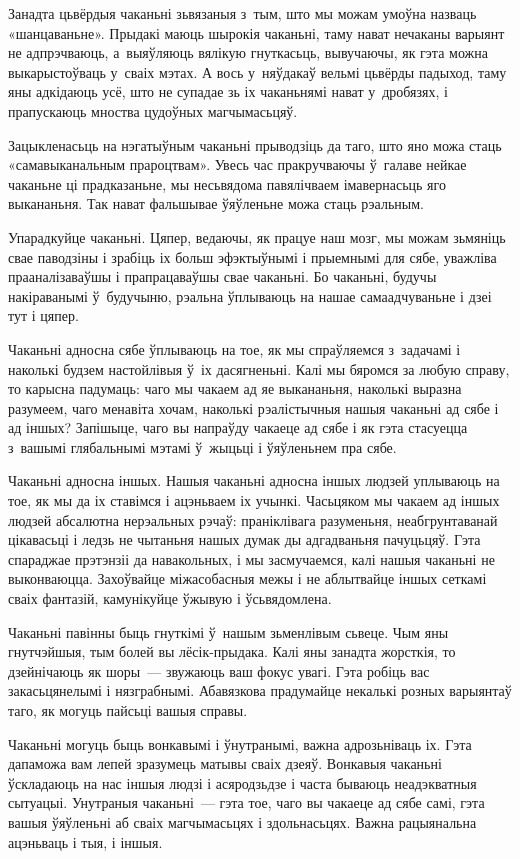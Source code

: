 Занадта цьвёрдыя чаканьні зьвязаныя з~тым, што мы можам умоўна назваць «шанцаваньне». Прыдакі маюць шырокія чаканьні, таму нават нечаканы варыянт не адпрэчваюць, а~выяўляюць вялікую гнуткасьць, вывучаючы, як гэта можна выкарыстоўваць у~сваіх мэтах. А вось у~няўдакаў вельмі цьвёрды падыход, таму яны адкідаюць усё, што не супадае зь іх чаканьнямі нават у~дробязях, і прапускаюць мноства цудоўных магчымасьцяў.

Зацыкленасьць на нэгатыўным чаканьні прыводзіць да таго, што яно можа стаць «самавыканальным прароцтвам». Увесь час пракручваючы ў~галаве нейкае чаканьне ці прадказаньне, мы несьвядома павялічваем імавернасьць яго выкананьня. Так нават фальшывае ўяўленьне можа стаць рэальным.

Упарадкуйце чаканьні. Цяпер, ведаючы, як працуе наш мозг, мы можам зьмяніць свае паводзіны і зрабіць іх больш эфэктыўнымі і прыемнымі для сябе, уважліва прааналізаваўшы і прапрацаваўшы свае чаканьні. Бо чаканьні, будучы накіраванымі ў~будучыню, рэальна ўплываюць на нашае самаадчуваньне і дзеі тут і цяпер.

Чаканьні адносна сябе ўплываюць на тое, як мы спраўляемся з~задачамі і наколькі будзем настойлівыя ў~іх дасягненьні. Калі мы бяромся за любую справу, то карысна падумаць: чаго мы чакаем ад яе выкананьня, наколькі выразна разумеем, чаго менавіта хочам, наколькі рэалістычныя нашыя чаканьні ад сябе і ад іншых? Запішыце, чаго вы напраўду чакаеце ад сябе і як гэта стасуецца з~вашымі глябальнымі мэтамі ў~жыцьці і ўяўленьнем пра сябе.

Чаканьні адносна іншых. Нашыя чаканьні адносна іншых людзей уплываюць на тое, як мы да іх ставімся і ацэньваем іх учынкі. Часьцяком мы чакаем ад іншых людзей абсалютна нерэальных рэчаў: праніклівага разуменьня, неабгрунтаванай цікавасьці і ледзь не чытаньня нашых думак ды адгадваньня пачуцьцяў. Гэта спараджае прэтэнзіі да навакольных, і мы засмучаемся, калі нашыя чаканьні не выконваюцца. Захоўвайце міжасобасныя межы і не аблытвайце іншых сеткамі сваіх фантазій, камунікуйце ўжывую і ўсьвядомлена.

Чаканьні павінны быць гнуткімі ў~нашым зьменлівым сьвеце. Чым яны гнутчэйшыя, тым болей вы лёсік-прыдака. Калі яны занадта жорсткія, то дзейнічаюць як шоры~--- звужаюць ваш фокус увагі. Гэта робіць вас закасьцянелымі і нязграбнымі. Абавязкова прадумайце некалькі розных варыянтаў таго, як могуць пайсьці вашыя справы.

Чаканьні могуць быць вонкавымі і ўнутранымі, важна адрозьніваць іх. Гэта дапаможа вам лепей зразумець матывы сваіх дзеяў. Вонкавыя чаканьні ўскладаюць на нас іншыя людзі і асяродзьдзе і часта бываюць неадэкватныя сытуацыі. Унутраныя чаканьні~--- гэта тое, чаго вы чакаеце ад сябе самі, гэта вашыя ўяўленьні аб сваіх магчымасьцях і здольнасьцях. Важна рацыянальна ацэньваць і тыя, і іншыя.

